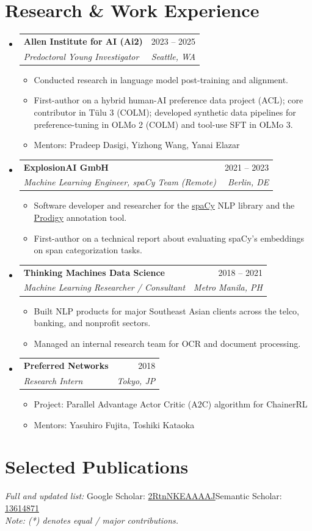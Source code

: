 \documentclass[a4paper,11pt]{article}
\makeatletter
\newcommand{\resumeItem}[1]{
  \item\small{
    {#1 \vspace{-2pt}}
  }
}
\newcommand{\resumeSubheading}[4]{
  \vspace{-2pt}\item
    \begin{tabular*}{0.97\textwidth}[t]{l@{\extracolsep{\fill}}r}
      \textbf{#1} & #2 \\
      \textit{\small#3} & \textit{\small #4} \\
    \end{tabular*}\vspace{-7pt}
}
\newcommand{\resumeSubHeadingListStart}{\begin{itemize}[leftmargin=0.15in, label={}]}
\newcommand{\resumeSubHeadingListEnd}{\end{itemize}}
\newcommand{\resumeItemListStart}{\begin{itemize}}
\newcommand{\resumeItemListEnd}{\end{itemize}\vspace{-5pt}}
\makeatother
\begin{document}
\section{Research \& Work Experience}
\resumeSubHeadingListStart

\resumeSubheading
{Allen Institute for AI (Ai2)}{2023 -- 2025}
{Predoctoral Young Investigator}{Seattle, WA}
\resumeItemListStart
\resumeItem{Conducted research in language model post-training and alignment.}
\resumeItem{First-author on a hybrid human-AI preference data project (ACL); core contributor in T\"ulu 3 (COLM); developed synthetic data pipelines for preference-tuning in OLMo 2 (COLM) and tool-use SFT in OLMo 3.}
\resumeItem{Mentors: Pradeep Dasigi, Yizhong Wang, Yanai Elazar}
\resumeItemListEnd

\resumeSubheading
{ExplosionAI GmbH}{2021 -- 2023}
{Machine Learning Engineer, spaCy Team (Remote)}{Berlin, DE}
\resumeItemListStart
\resumeItem{Software developer and researcher for the \href{https://spacy.io}{spaCy} NLP library and the \href{https://prodigy.ai}{Prodigy} annotation tool.}
\resumeItem{First-author on a technical report about evaluating spaCy's embeddings on span categorization tasks.}
\resumeItemListEnd

\resumeSubheading
{Thinking Machines Data Science}{2018 -- 2021}
{Machine Learning Researcher / Consultant}{Metro Manila, PH}
\resumeItemListStart
\resumeItem{Built NLP products for major Southeast Asian clients across the telco, banking, and nonprofit sectors.}
\resumeItem{Managed an internal research team for OCR and document processing.}
\resumeItemListEnd

\resumeSubheading
{Preferred Networks}{2018}
{Research Intern}{Tokyo, JP}
\resumeItemListStart
\resumeItem{Project: Parallel Advantage Actor Critic (A2C) algorithm for ChainerRL}
\resumeItem{Mentors: Yasuhiro Fujita, Toshiki Kataoka}
\resumeItemListEnd

\resumeSubHeadingListEnd

\section{Selected Publications}
\textit{Full and updated list:} Google Scholar: \href{https://scholar.google.com/citations?user=2RtnNKEAAAAJ&hl=en}{2RtnNKEAAAAJ}\quad Semantic Scholar: \href{https://www.semanticscholar.org/author/Lester-James-Validad-Miranda/13614871}{13614871}\\
\textit{Note: (*) denotes equal / major contributions.}
\end{document}
